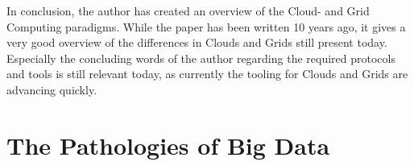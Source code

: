 \documentclass{article}
\begin{document}
In conclusion, the author has created an overview of the Cloud- and Grid
Computing paradigms. While the paper has been written 10 years ago, it gives a
very good overview of the differences in Clouds and Grids still present today.
Especially the concluding words of the author regarding the required protocols
and tools is still relevant today, as currently the tooling for Clouds and Grids
are advancing quickly.


\section*{The Pathologies of Big Data}
\end{document}
